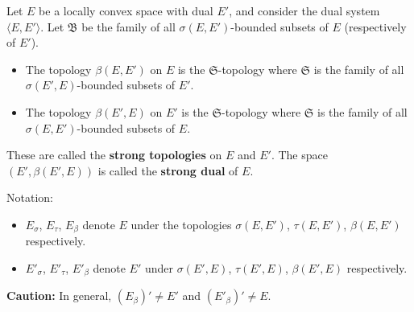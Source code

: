 Let $E$ be a locally convex space with dual $E'$, and consider the dual system $\langle E, E' \rangle$. Let $\mathfrak{B}$ be the family of all $\sigma(E, E')$-bounded subsets of $E$ (respectively of $E'$).

\begin{itemize}
\item The topology $\beta(E, E')$ on $E$ is the $\mathfrak{S}$-topology where $\mathfrak{S}$ is the family of all $\sigma(E', E)$-bounded subsets of $E'$.
\item The topology $\beta(E', E)$ on $E'$ is the $\mathfrak{S}$-topology where $\mathfrak{S}$ is the family of all $\sigma(E, E')$-bounded subsets of $E$.
\end{itemize}

These are called the \textbf{strong topologies} on $E$ and $E'$. The space $(E', \beta(E', E))$ is called the \textbf{strong dual} of $E$.

Notation:
\begin{itemize}
\item $E_\sigma$, $E_\tau$, $E_\beta$ denote $E$ under the topologies $\sigma(E, E')$, $\tau(E, E')$, $\beta(E, E')$ respectively.
\item $E'_\sigma$, $E'_\tau$, $E'_\beta$ denote $E'$ under $\sigma(E', E)$, $\tau(E', E)$, $\beta(E', E)$ respectively.
\end{itemize}

\textbf{Caution:} In general, $(E_\beta)' \neq E'$ and $(E'_\beta)' \neq E$.

